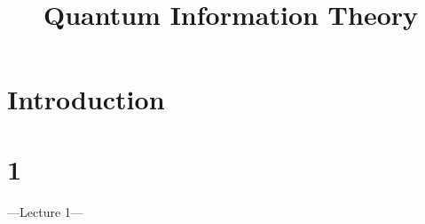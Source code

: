 \documentclass[a4paper]{article}
\begin{document}
\title{Quantum Information Theory}

\maketitle

\newpage

\tableofcontents

\newpage

\section{Introduction}

\newpage

\section{1}

---Lecture 1---
\end{document}
